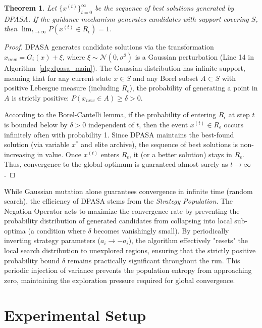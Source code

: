 \documentclass[11pt]{article}
\newtheorem{theorem}{Theorem}
\begin{document}
\begin{theorem}
Let $\{x^{(t)}\}_{t=0}^\infty$ be the sequence of best solutions generated by DPASA. If the guidance mechanism generates candidates with support covering $S$, then $\lim_{t \to \infty} P(x^{(t)} \in R_\epsilon) = 1$.
\end{theorem}

\begin{proof}
DPASA generates candidate solutions via the transformation $x_{new} = G_i(x) + \xi$, where $\xi \sim \mathcal{N}(0, \sigma^2)$ is a Gaussian perturbation (Line 14 in Algorithm~\ref{alg:dpasa_main}). The Gaussian distribution has infinite support, meaning that for any current state $x \in S$ and any Borel subset $A \subset S$ with positive Lebesgue measure (including $R_\epsilon$), the probability of generating a point in $A$ is strictly positive: $P(x_{new} \in A) \geq \delta > 0$.

According to the Borel-Cantelli lemma, if the probability of entering $R_\epsilon$ at step $t$ is bounded below by $\delta > 0$ independent of $t$, then the event $x^{(t)} \in R_\epsilon$ occurs infinitely often with probability 1. Since DPASA maintains the best-found solution (via variable $x^*$ and elite archive), the sequence of best solutions is non-increasing in value. Once $x^{(t)}$ enters $R_\epsilon$, it (or a better solution) stays in $R_\epsilon$. Thus, convergence to the global optimum is guaranteed almost surely as $t \to \infty$.
\end{proof}

While Gaussian mutation alone guarantees convergence in infinite time (random search), the efficiency of DPASA stems from the \textit{Strategy Population}. The Negation Operator acts to maximize the convergence rate by preventing the probability distribution of generated candidates from collapsing into local sub-optima (a condition where $\delta$ becomes vanishingly small). By periodically inverting strategy parameters ($a_i \to -a_i$), the algorithm effectively "resets" the local search distribution to unexplored regions, ensuring that the strictly positive probability bound $\delta$ remains practically significant throughout the run. This periodic injection of variance prevents the population entropy from approaching zero, maintaining the exploration pressure required for global convergence.


\section{Experimental Setup}
\label{sec:experimental_setup}
\end{document}
